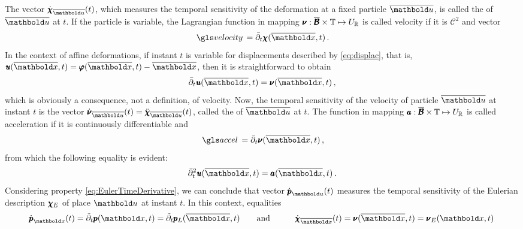 The vector $\dot{\tnr{\chi}}_{\overline{\vto{u}}}(t)$, which measures the temporal sensitivity of the deformation at a fixed particle $\overline{\vto{u}}$, is called the  of $\overline{\vto{u}}$ at $t$. If the particle is variable, the Lagrangian function in mapping ${\pmb{\nu}} : \overline{\pmb{\mathcal{B}}}\times\mathbb{T} \mapsto U_{\mathbb{R}}$ is called velocity if it is $\mathcal{C}^{2}$ and vector
\begin{equation}
\gloref{velocity}=\bar{\partial}_t\tnr{\chi}(\overline{\vto{x}},t)\,.
\end{equation}
In the context of affine deformations, if instant $t$ is variable for displacements described by \eqref{eq:displac}, that is, $\fua{\tnr{\mathit{u}}}{\overline{\vto{x}},t}=\fua{\tnr{\varphi}}{\overline{\vto{x}},t} - \overline{\vto{x}}$, then it is straightforward to obtain 
\begin{equation}
\bar{\partial}_t\fua{\tnr{\mathit{u}}}{\overline{\vto{x}},t} =  {\tnr{\nu}}(\overline{\vto{x}},t)\,,
\end{equation}
which is obviously a consequence, not a definition, of velocity. Now, the temporal sensitivity of the velocity of particle $\overline{\vto{u}}$ at instant $t$ is the vector $\dot{\tnr{\nu}}_{\overline{\vto{u}}}(t)=\ddot{\tnr{\chi}}_{\overline{\vto{u}}}(t)$, called the  of $\overline{\vto{u}}$ at $t$. The function in mapping ${\pmb{a}} : \overline{\pmb{\mathcal{B}}}\times\mathbb{T} \mapsto U_{\mathbb{R}}$ is called acceleration if it is continuously differentiable and
\begin{equation}
\gloref{accel}=\bar{\partial}_t\tnr{\nu}(\overline{\vto{x}},t)\,,
\end{equation}
from which the following equality is evident:
\begin{equation}
\bar{\partial}_t^2\fua{\tnr{\mathit{u}}}{\overline{\vto{x}},t} =  {\tnr{a}}(\overline{\vto{x}},t)\,.
\end{equation}
Considering property \eqref{eq:EulerTimeDerivative}, we can conclude that vector $\dot{\tnr{p}}_{{\vto{u}}}(t)$ measures the temporal sensitivity of the Eulerian description $\pmb{\chi}_E$ of place $\vto{u}$ at instant $t$. In this context, equalities
\begin{alignat*}{3} 
\dot{\tnr{p}}_{{\vto{x}}}(t) = \tilde{\partial}_t \tnr{p}(\vto{x},t) = \tilde{\partial}_t \tnr{p}_L(\overline{\vto{x}},t)&\qquad \text{and}\qquad & \dot{\tnr{\chi}}_{\overline{\vto{x}}}(t) = \tnr{\nu}(\overline{\vto{x}},t) = \tnr{\nu}_E({\vto{x}},t)\,
\end{alignat*}

